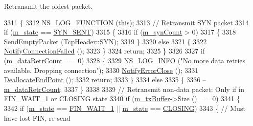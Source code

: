 Retransmit the oldest packet. 


\begin{DoxyCode}
3311 \{
3312   \hyperlink{log-macros-disabled_8h_a90b90d5bad1f39cb1b64923ea94c0761}{NS\_LOG\_FUNCTION} (\textcolor{keyword}{this});
3313   \textcolor{comment}{// Retransmit SYN packet}
3314   \textcolor{keywordflow}{if} (\hyperlink{classns3_1_1TcpSocketBase_a5db6f29272f23546e23320c06a681f3e}{m\_state} == \hyperlink{group__tcp_gga3929cdb47bdf159657fa24054aa5ca03a93f185d16390df3819d44eca0c349cc3}{SYN\_SENT})
3315     \{
3316       \textcolor{keywordflow}{if} (\hyperlink{classns3_1_1TcpSocketBase_addf20037951e7b85435a97d8885ea844}{m\_synCount} > 0)
3317         \{
3318           \hyperlink{classns3_1_1TcpSocketBase_aa858913c9a4480a14d293f1014905b3e}{SendEmptyPacket} (\hyperlink{classns3_1_1TcpHeader_a5f3d432941327854b5ad621e467479c6aa28ef8087c3cb5f3db10d728063b6ac0}{TcpHeader::SYN});
3319         \}
3320       \textcolor{keywordflow}{else}
3321         \{
3322           \hyperlink{classns3_1_1Socket_a34f83cdc8fb487ac8ea5436d184827c4}{NotifyConnectionFailed} ();
3323         \}
3324       \textcolor{keywordflow}{return};
3325     \}
3326 
3327   \textcolor{keywordflow}{if} (\hyperlink{classns3_1_1TcpSocketBase_ace7efd32ba5d109037ddd08e128d589d}{m\_dataRetrCount} == 0)
3328     \{
3329       \hyperlink{group__logging_gafbd73ee2cf9f26b319f49086d8e860fb}{NS\_LOG\_INFO} (\textcolor{stringliteral}{"No more data retries available. Dropping connection"});
3330       \hyperlink{classns3_1_1Socket_a9b89cb8b7718d3a0641ce812970f9c16}{NotifyErrorClose} ();
3331       \hyperlink{classns3_1_1TcpSocketBase_a53791738228495d40197679dbc057392}{DeallocateEndPoint} ();
3332       \textcolor{keywordflow}{return};
3333     \}
3334   \textcolor{keywordflow}{else}
3335     \{
3336       --\hyperlink{classns3_1_1TcpSocketBase_ace7efd32ba5d109037ddd08e128d589d}{m\_dataRetrCount};
3337     \}
3338 
3339   \textcolor{comment}{// Retransmit non-data packet: Only if in FIN\_WAIT\_1 or CLOSING state}
3340   \textcolor{keywordflow}{if} (\hyperlink{classns3_1_1TcpSocketBase_a4a1b53982ffd851bd07ab8d5005c130e}{m\_txBuffer}->Size () == 0)
3341     \{
3342       \textcolor{keywordflow}{if} (\hyperlink{classns3_1_1TcpSocketBase_a5db6f29272f23546e23320c06a681f3e}{m\_state} == \hyperlink{group__tcp_gga3929cdb47bdf159657fa24054aa5ca03a9f54edeb0f23302ae1c36d433b587b02}{FIN\_WAIT\_1} || \hyperlink{classns3_1_1TcpSocketBase_a5db6f29272f23546e23320c06a681f3e}{m\_state} == \hyperlink{group__tcp_gga3929cdb47bdf159657fa24054aa5ca03aed7b7568d5e6519d8ce40712445b533d}{CLOSING})
3343         \{ \textcolor{comment}{// Must have lost FIN, re-send}

\end{DoxyCode}
